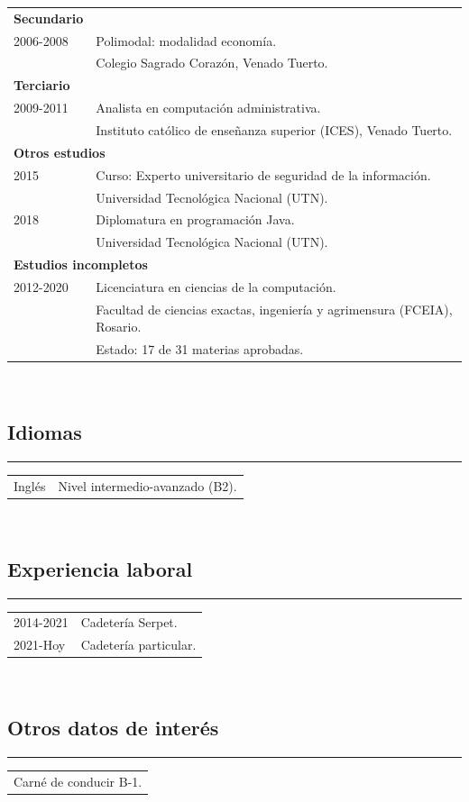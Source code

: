 \documentclass[12pt]{article}
\begin{document}
\begin{tabular}{l l}
  \multicolumn{1}{l}{\textbf{Secundario}}\\
  2006-2008&Polimodal: modalidad economía.\\
           &\small{Colegio Sagrado Corazón, Venado Tuerto.}\\
  \multicolumn{2}{l}{\textbf{Terciario}}\\
  2009-2011&Analista en computación administrativa.\\
           &\small{Instituto católico de enseñanza superior (ICES), Venado Tuerto.}\\
  \multicolumn{2}{l}{\textbf{Otros estudios}}\\
  2015&Curso: Experto universitario de seguridad de la información.\\
           &\small{Universidad Tecnológica Nacional (UTN).}\\
  2018&Diplomatura en programación Java.\\
           &\small{Universidad Tecnológica Nacional (UTN).}\\
  \multicolumn{2}{l}{\textbf{Estudios incompletos}}\\
  2012-2020&Licenciatura en ciencias de la computación.\\
           &\small{Facultad de ciencias exactas, ingeniería y agrimensura (FCEIA), Rosario.}\\
           &\small{Estado: 17 de 31 materias aprobadas.}\\
\end{tabular}\\
{\color{blue}\subsection*{Idiomas}}
\hrule
\begin{tabular}{l l}
  Inglés&Nivel intermedio-avanzado (B2).\\
\end{tabular}\\
{\color{blue}\subsection*{Experiencia laboral}}
\hrule
\begin{tabular}{l l}
  2014-2021&Cadetería Serpet.\\
  2021-Hoy&Cadetería particular.
\end{tabular}\\
{\color{blue}\subsection*{Otros datos de interés}}
\hrule
\begin{tabular}{l}
  Carné de conducir B-1.\\
\end{tabular}
\end{document}

